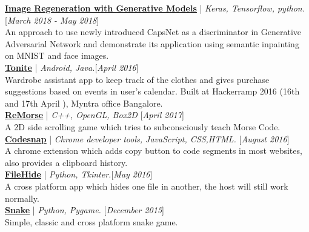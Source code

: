 \documentclass[10pt]{article}
\renewcommand{\textbf}[1]{{\bfseries\sffamily\color{accent_darkest}#1}}
\begin{document}
\textbf{\underline{\href{https://github.com/abhijith0505/Tonite}
{Image Regeneration with Generative Models}}} | \textit{Keras, Tensorflow, python.}\hfill\textcolor{grey_darker}{[\textit{March 2018 - May 2018}]}\\
An approach to use newly introduced CapsNet as a discriminator in Generative Adversarial Network and demonstrate its application using semantic inpainting on MNIST and face images.
\smallskip
\\
\textbf{\underline{\href{https://github.com/abhijith0505/Tonite}
{Tonite}}} | \textit{Android, Java.}\hfill\textcolor{grey_darker}{[\textit{April 2016}]}\\
Wardrobe assistant app to keep track of the clothes and gives purchase
suggestions based on events in user's calendar. Built at Hackerramp
2016 (16th and 17th April ), Myntra office Bangalore.
\smallskip
\\
\textbf{\underline{\href{https://github.com/RaghavaDhanya/ReMorse}
{ReMorse}}}  | \textit{C++, OpenGL, Box2D} \hfill\textcolor{grey_darker}{[\textit{April 2017}]}
\\
A 2D side scrolling game which tries to subconsciously teach Morse Code.
\smallskip
\\
\textbf{\underline{\href{https://github.com/RaghavaDhanya/Codesnap}
{Codesnap}}} | \textit{Chrome developer tools, JavaScript, CSS,HTML. }
\hfill\textcolor{grey_darker}{[\textit{August 2016}]}
\\
A chrome extension which adds copy button to code segments in most
websites, also provides a clipboard history.
\smallskip
\\
\textbf{\underline{\href{https://github.com/RaghavaDhanya/FileHide}
{FileHide}}} | \textit{Python, Tkinter.}\hfill\textcolor{grey_darker}{[\textit{May 2016}]}
\\
A cross platform app which hides one file in another, the host will
still work normally.
\smallskip
\\
\textbf{\underline{\href{https://github.com/RaghavaDhanya/Snake}
{Snake}}} | \textit{Python, Pygame.} \hfill\textcolor{grey_darker}{[\textit{December 2015}]}
\\
Simple, classic and cross platform snake game.

\end{document}
